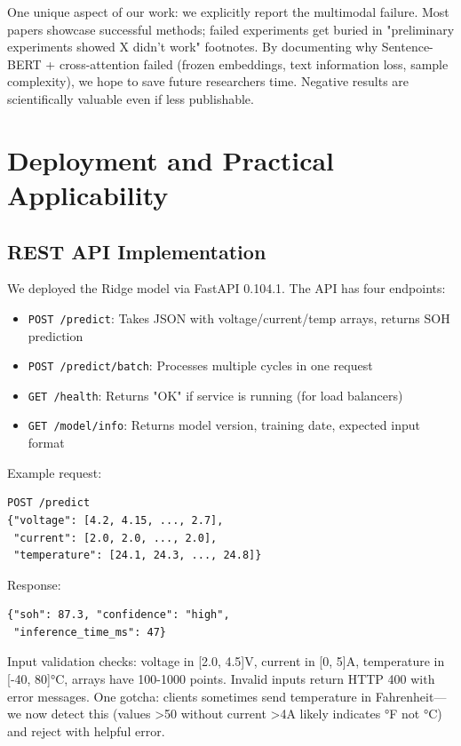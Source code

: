 \documentclass{sn-jnl}
\begin{document}
One unique aspect of our work: we explicitly report the multimodal failure. Most papers showcase successful methods; failed experiments get buried in "preliminary experiments showed X didn't work" footnotes. By documenting why Sentence-BERT + cross-attention failed (frozen embeddings, text information loss, sample complexity), we hope to save future researchers time. Negative results are scientifically valuable even if less publishable.

\section{Deployment and Practical Applicability}
\label{sec:deployment}

\subsection{REST API Implementation}
\label{subsec:api}

We deployed the Ridge model via FastAPI 0.104.1. The API has four endpoints:
\begin{itemize}
\item \texttt{POST /predict}: Takes JSON with voltage/current/temp arrays, returns SOH prediction
\item \texttt{POST /predict/batch}: Processes multiple cycles in one request
\item \texttt{GET /health}: Returns "OK" if service is running (for load balancers)
\item \texttt{GET /model/info}: Returns model version, training date, expected input format
\end{itemize}

Example request:
\begin{verbatim}
POST /predict
{"voltage": [4.2, 4.15, ..., 2.7],
 "current": [2.0, 2.0, ..., 2.0],
 "temperature": [24.1, 24.3, ..., 24.8]}
\end{verbatim}
Response:
\begin{verbatim}
{"soh": 87.3, "confidence": "high",
 "inference_time_ms": 47}
\end{verbatim}

Input validation checks: voltage in [2.0, 4.5]V, current in [0, 5]A, temperature in [-40, 80]°C, arrays have 100-1000 points. Invalid inputs return HTTP 400 with error messages. One gotcha: clients sometimes send temperature in Fahrenheit—we now detect this (values >50 without current >4A likely indicates °F not °C) and reject with helpful error.
\end{document}
